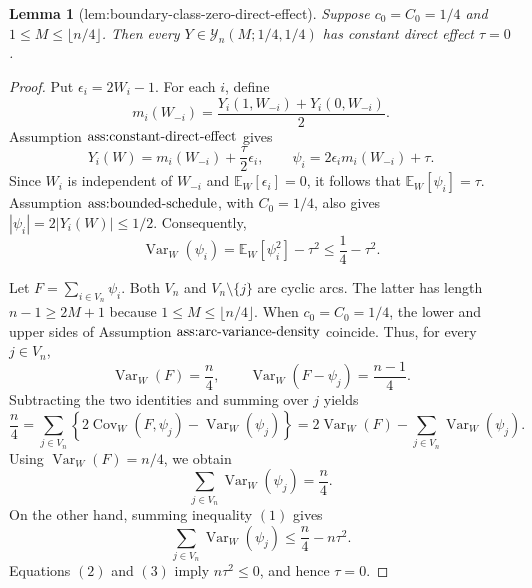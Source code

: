 \documentclass{article}
\newtheorem{lemma}{Lemma}
\begin{document}
\begin{lemma}[lem:boundary-class-zero-direct-effect]\label{lem:boundary-class-zero-direct-effect}
Suppose \(c_0=C_0=1/4\) and \(1\le M\le\lfloor n/4\rfloor\). Then every \(Y\in\mathcal Y_n(M;1/4,1/4)\) has constant direct effect \(\tau=0\).
\end{lemma}
\begin{proof}
Put \(\epsilon_i=2W_i-1\). For each \(i\), define\[m_i(W_{-i})=\frac{Y_i(1,W_{-i})+Y_i(0,W_{-i})}{2}.\]Assumption \(\textnormal{ass:constant-direct-effect}\) gives\[Y_i(W)=m_i(W_{-i})+\frac{\tau}{2}\epsilon_i,\qquad \psi_i=2\epsilon_i m_i(W_{-i})+\tau.\]Since \(W_i\) is independent of \(W_{-i}\) and \(\mathbb E_W[\epsilon_i]=0\), it follows that \(\mathbb E_W[\psi_i]=\tau\). Assumption \(\textnormal{ass:bounded-schedule}\), with \(C_0=1/4\), also gives \(|\psi_i|=2|Y_i(W)|\le1/2\). Consequently,\[\operatorname{Var}_W(\psi_i)=\mathbb E_W[\psi_i^2]-\tau^2\le\frac14-\tau^2.\tag{1}\]

Let \(F=\sum_{i\in V_n}\psi_i\). Both \(V_n\) and \(V_n\setminus\{j\}\) are cyclic arcs. The latter has length \(n-1\ge2M+1\) because \(1\le M\le\lfloor n/4\rfloor\). When \(c_0=C_0=1/4\), the lower and upper sides of Assumption \(\textnormal{ass:arc-variance-density}\) coincide. Thus, for every \(j\in V_n\),\[\operatorname{Var}_W(F)=\frac n4,\qquad \operatorname{Var}_W(F-\psi_j)=\frac{n-1}{4}.\]Subtracting the two identities and summing over \(j\) yields\[\frac n4=\sum_{j\in V_n}\left\{2\operatorname{Cov}_W(F,\psi_j)-\operatorname{Var}_W(\psi_j)\right\}=2\operatorname{Var}_W(F)-\sum_{j\in V_n}\operatorname{Var}_W(\psi_j).\]Using \(\operatorname{Var}_W(F)=n/4\), we obtain\[\sum_{j\in V_n}\operatorname{Var}_W(\psi_j)=\frac n4.\tag{2}\]On the other hand, summing inequality \((1)\) gives\[\sum_{j\in V_n}\operatorname{Var}_W(\psi_j)\le\frac n4-n\tau^2.\tag{3}\]Equations \((2)\) and \((3)\) imply \(n\tau^2\le0\), and hence \(\tau=0\).
\end{proof}
\end{document}
